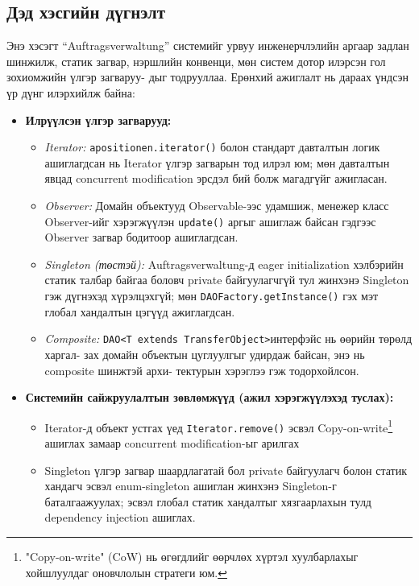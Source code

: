 \subsection{Дэд хэсгийн дүгнэлт}
Энэ хэсэгт “Auftragsverwaltung” системийг урвуу инженерчлэлийн аргаар задлан шинжилж, статик загвар, нэршлийн конвенци, мөн систем дотор илэрсэн гол зохиомжийн үлгэр загваруу- дыг тодрууллаа. Ерөнхий ажиглалт нь дараах үндсэн үр дүнг илэрхийлж байна:

\begin{itemize}
\item \textbf{Илрүүлсэн үлгэр загварууд:}
\begin{itemize}
\item \emph{Iterator:} \verb|apositionen.iterator()| болон стандарт давталтын логик ашиглагдсан нь Iterator үлгэр загварын тод илрэл юм; мөн давталтын явцад concurrent modification эрсдэл бий болж магадгүйг ажигласан.
\item \emph{Observer:} Домайн объектууд Observable-ээс удамшиж, менежер класс Observer-ийг хэрэгжүүлэн \verb|update()| аргыг ашиглаж байсан гэдгээс Observer загвар бодитоор ашиглагдсан.
\item \emph{Singleton (төстэй):} Auftragsverwaltung-д eager initialization хэлбэрийн статик талбар байгаа боловч private байгуулагчгүй тул жинхэнэ Singleton гэж дүгнэхэд хүрэлцэхгүй; мөн \verb|DAOFactory.getInstance()| гэх мэт глобал хандалтын цэгүүд ажиглагдсан.
\item \emph{Composite:} \verb|DAO<T extends TransferObject>|интерфэйс нь өөрийн төрөлд харгал- зах домайн объектын цуглуулгыг удирдаж байсан, энэ нь composite шинжтэй архи- тектурын хэрэглээ гэж тодорхойлсон.
\end{itemize}
\item \textbf{Системийн сайжруулалтын зөвлөмжүүд (ажил хэрэгжүүлэхэд туслах):}
\begin{itemize}
\item Iterator-д объект устгах үед \verb|Iterator.remove()| эсвэл Copy-on-write\footnote{"Copy-on-write" (CoW) нь өгөгдлийг өөрчлөх хүртэл хуулбарлахыг хойшлуулдаг оновчлолын стратеги юм.} ашиглах замаар concurrent modification-ыг арилгах
\item Singleton үлгэр загвар шаардлагатай бол private байгуулагч болон статик хандагч эсвэл enum-singleton ашиглан жинхэнэ Singleton-г баталгаажуулах; эсвэл глобал статик хандалтыг хязгаарлахын тулд dependency injection ашиглах.
\end{itemize}
\end{itemize}

